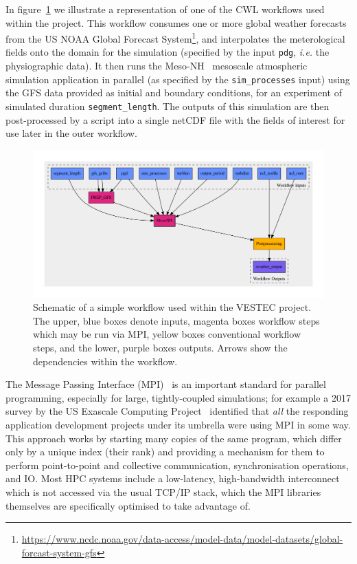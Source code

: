 \documentclass[conference]{IEEEtran}
\begin{document}
In figure~\ref{fig:mnh-wf} we illustrate a representation of one of the CWL workflows used within the project. This workflow consumes one or more global weather forecasts from the US NOAA Global Forecast System\footnote{\url{https://www.ncdc.noaa.gov/data-access/model-data/model-datasets/global-forcast-system-gfs}}, and interpolates the meterological fields onto the domain for the simulation (specified by the input \verb`pdg`, \emph{i.e.} the physiographic data). 
It then runs the Meso-NH~\cite{mnh54} mesoscale atmospheric simulation application in parallel (as specified by the \verb`sim_processes` input) using the GFS data provided as initial and boundary conditions, for an experiment of simulated duration \verb`segment_length`. The outputs of this simulation are then post-processed by a script into a single netCDF file with the fields of interest for use later in the outer workflow.

\begin{figure}[!tb]
    \centering
    \includegraphics[width=\textwidth]{mnh.pdf}
    \caption{Schematic of a simple workflow used within the VESTEC project. The upper, blue boxes denote inputs, magenta boxes workflow steps which may be run via MPI, yellow boxes conventional workflow steps, and the lower, purple boxes outputs. Arrows show the dependencies within the workflow.}
    \label{fig:mnh-wf}
\end{figure}

The Message Passing Interface (MPI)~\cite{MPI31} is an important standard for parallel programming, especially for large, tightly-coupled simulations; for example a 2017 survey by the US Exascale Computing Project~\cite{ecpsurvey} identified that \emph{all} the responding application development projects under its umbrella were using MPI in some way. This approach works by starting many copies of the same program, which differ only by a unique index (their rank) and providing a mechanism for them to perform point-to-point and collective communication, synchronisation operations, and  IO. Most HPC systems include a low-latency, high-bandwidth interconnect which is not accessed via the usual TCP/IP stack, which the MPI libraries themselves are specifically optimised to take advantage of. 
\end{document}
